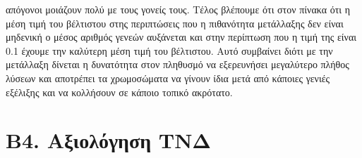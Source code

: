 \documentclass[12pt,a4paper]{article}
\begin{document}
\begin{enumerate}[a)]
                    απόγονοι μοιάζουν πολύ με τους γονείς τους. Τέλος βλέπουμε ότι στον πίνακα ότι
                    η μέση τιμή του βέλτιστου στης περιπτώσεις που η πιθανότητα
                    μετάλλαξης δεν είναι μηδενική ο μέσος αριθμός
                    γενεών αυξάνεται και στην περίπτωση που η τιμή της είναι 0.1
                    έχουμε την καλύτερη μέση τιμή του βέλτιστου.
                    Αυτό συμβαίνει διότι με την μετάλλαξη δίνεται η δυνατότητα στον
                    πληθυσμό να εξερευνήσει μεγαλύτερο πλήθος
                    λύσεων και αποτρέπει τα χρωμοσώματα να γίνουν ίδια μετά από κάποιες
                    γενιές εξέλιξης και να κολλήσουν σε κάποιο τοπικό ακρότατο.
        \end{enumerate}

        \section*{Β4. Αξιολόγηση ΤΝΔ}
\end{document}
